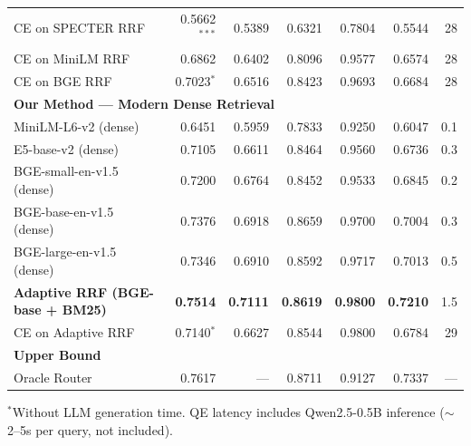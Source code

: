 \begin{table}[htbp]
{\begin{tabular}{lrrrrrr}
CE on SPECTER RRF                    & 0.5662$^{***}$ & 0.5389 & 0.6321 & 0.7804 & 0.5544 & 28 \\
CE on MiniLM RRF                     & 0.6862         & 0.6402 & 0.8096 & 0.9577 & 0.6574 & 28 \\
CE on BGE RRF                        & 0.7023$^{*}$   & 0.6516 & 0.8423 & 0.9693 & 0.6684 & 28 \\
\midrule
\multicolumn{7}{l}{\textbf{Our Method — Modern Dense Retrieval}} \\
\midrule
MiniLM-L6-v2 (dense)                 & 0.6451        & 0.5959 & 0.7833 & 0.9250 & 0.6047 & 0.1 \\
E5-base-v2 (dense)                   & 0.7105        & 0.6611 & 0.8464 & 0.9560 & 0.6736 & 0.3 \\
BGE-small-en-v1.5 (dense)            & 0.7200        & 0.6764 & 0.8452 & 0.9533 & 0.6845 & 0.2 \\
BGE-base-en-v1.5 (dense)             & 0.7376        & 0.6918 & 0.8659 & 0.9700 & 0.7004 & 0.3 \\
BGE-large-en-v1.5 (dense)            & 0.7346        & 0.6910 & 0.8592 & 0.9717 & 0.7013 & 0.5 \\
\textbf{Adaptive RRF (BGE-base + BM25)}  & \textbf{0.7514} & \textbf{0.7111} & \textbf{0.8619} & \textbf{0.9800} & \textbf{0.7210} & 1.5 \\
CE on Adaptive RRF                   & 0.7140$^{*}$   & 0.6627 & 0.8544 & 0.9800 & 0.6784 & 29 \\
\midrule
\multicolumn{7}{l}{\textbf{Upper Bound}} \\
\midrule
Oracle Router                        & 0.7617        & ---    & 0.8711 & 0.9127 & 0.7337 & --- \\
\bottomrule
\end{tabular}
}
{\footnotesize $^*$Without LLM generation time. QE latency includes Qwen2.5-0.5B inference ($\sim$2--5s per query, not included).}
\end{table}
